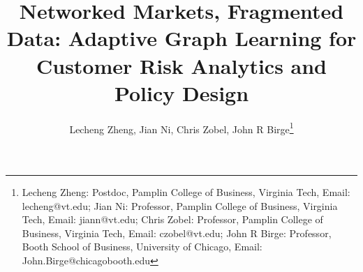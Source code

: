 \documentclass[11pt,english]{article}
\begin{document}
\title{\Large {Networked Markets, Fragmented Data: Adaptive Graph Learning for Customer Risk Analytics and Policy Design}}
\vspace{-25ex}
\author{Lecheng Zheng, Jian Ni, Chris Zobel, John R Birge\thanks{Lecheng Zheng: Postdoc, Pamplin College of Business, Virginia Tech,  Email: lecheng@vt.edu; Jian Ni: Professor, Pamplin College of Business, Virginia Tech,  Email: jiann@vt.edu; Chris Zobel: Professor, Pamplin College of Business, Virginia Tech, Email: czobel@vt.edu; John R Birge: Professor, Booth School of Business, University of Chicago, Email: John.Birge@chicagobooth.edu}
}

\date{\vspace{-5ex}}

\maketitle

\fontsize{11pt}{11pt}\selectfont
\end{document}

